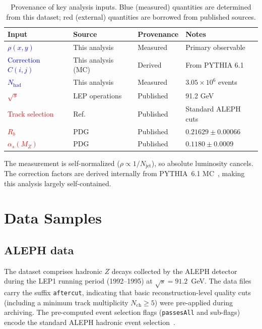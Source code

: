 \documentclass[11pt,a4paper]{article}
\newcommand{\measured}[1]{\textcolor{blue}{#1}}
\newcommand{\external}[1]{\textcolor{red}{#1}}
\begin{document}
\begin{table}[htbp]
\centering
\caption{Provenance of key analysis inputs.  Blue (measured) quantities
  are determined from this dataset; red (external) quantities are borrowed
  from published sources.}
\label{tbl:provenance}
\begin{tabular}{llll}
\toprule
Input & Source & Provenance & Notes \\
\midrule
\measured{$\rho(x,y)$} & This analysis & Measured & Primary observable \\
\measured{Correction $C(i,j)$} & This analysis (MC) & Derived & From PYTHIA 6.1 \\
\measured{$N_\text{had}$} & This analysis & Measured & $3.05 \times 10^6$ events \\
\external{$\sqrt{s}$} & LEP operations & Published & 91.2 GeV \\
\external{Track selection} & Ref.~\cite{ALEPH:1998hhr,ALEPH:1998vtv} & Published & Standard ALEPH cuts \\
\external{$R_b$} & PDG~\cite{ParticleDataGroup:2024cfk} & Published & $0.21629 \pm 0.00066$ \\
\external{$\alpha_s(M_Z)$} & PDG~\cite{ParticleDataGroup:2024cfk} & Published & $0.1180 \pm 0.0009$ \\
\bottomrule
\end{tabular}
\end{table}

The measurement is self-normalized ($\rho \propto 1/N_\text{jet}$),
so absolute luminosity cancels.  The correction factors are
derived internally from PYTHIA~6.1 MC~\cite{Sjostrand:2000wi},
making this analysis largely self-contained.

\section{Data Samples}
\label{sec:data}

\subsection{ALEPH data}
\label{sec:data-aleph}

The dataset comprises hadronic $Z$ decays collected by the ALEPH
detector~\cite{ALEPH:1995aqm} during the LEP1 running period
(1992--1995) at $\sqrt{s} = 91.2$~GeV.  The data files carry the
suffix \texttt{aftercut}, indicating that basic reconstruction-level
quality cuts (including a minimum track multiplicity $N_\text{ch}
\ge 5$) were pre-applied during archiving.  The pre-computed event
selection flags (\texttt{passesAll} and sub-flags) encode the standard
ALEPH hadronic event selection~\cite{ALEPH:1998vtv,ALEPH:1999rgl}.
\end{document}
